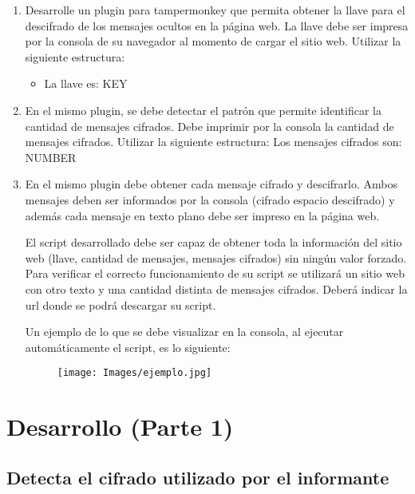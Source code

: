 \documentclass[letter,12pt]{article}
\begin{document}
\begin{enumerate}
    \item Desarrolle un plugin para tampermonkey que permita obtener la llave para el descifrado de los mensajes ocultos en la página web. La llave debe ser impresa por la consola de su navegador al momento de cargar el sitio web. Utilizar la siguiente estructura:
    \begin{itemize}
        \item   La llave es: KEY
    \end{itemize}
    
    \item En el mismo plugin, se debe detectar el patrón que permite identificar la cantidad de mensajes cifrados. Debe imprimir por la consola la cantidad de mensajes cifrados. Utilizar la siguiente estructura:
    Los mensajes cifrados son: NUMBER
    
    \item En el mismo plugin debe obtener cada mensaje cifrado y descifrarlo. Ambos mensajes deben ser informados por la consola (cifrado espacio descifrado) y además cada mensaje en texto plano debe ser impreso en la página web. \par
    El script desarrollado debe ser capaz de obtener toda la información del sitio web (llave, cantidad de mensajes, mensajes cifrados) sin ningún valor forzado. Para verificar el correcto funcionamiento de su script se utilizará un sitio web con otro texto y una cantidad distinta de mensajes cifrados. Deberá indicar la url donde se podrá descargar su script.\par
    Un ejemplo de lo que se debe visualizar en la consola, al ejecutar automáticamente el script, es lo siguiente:

\clearpage

    \begin{figure}[H]
        \centering
        \texttt{[image: Images/ejemplo.jpg]}
        \label{fig:ejemplo}
    \end{figure}
    
\clearpage

\end{enumerate}



\section{Desarrollo (Parte 1)}
\subsection{Detecta el cifrado utilizado por el informante}
\end{document}
